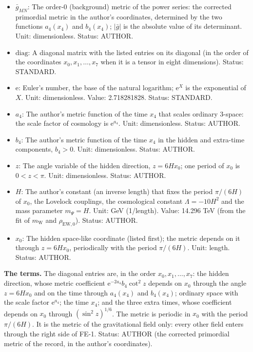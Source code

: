 \documentclass[
  10pt,
]{article}
\providecommand{\tightlist}{%
  \setlength{\itemsep}{0pt}\setlength{\parskip}{0pt}}
\begin{document}
\begin{itemize}
\tightlist
\item
  \(\bar g_{MN}\): The order-0 (background) metric of the power series:
  the corrected primordial metric in the author's coordinates,
  determined by the two functions \(a_4(x_4)\) and \(b_4(x_4)\);
  \(\lvert\bar g\rvert\) is the absolute value of its determinant. Unit:
  dimensionless. Status: AUTHOR.
\item
  \(\mathrm{diag}\): A diagonal matrix with the listed entries on its
  diagonal (in the order of the coordinates \(x_0, x_1, \dots, x_7\)
  when it is a tensor in eight dimensions). Status: STANDARD.
\item
  \(\mathrm{e}\): Euler's number, the base of the natural logarithm;
  \(\mathrm{e}^{X}\) is the exponential of \(X\). Unit: dimensionless.
  Value: 2.718281828. Status: STANDARD.
\item
  \(a_4\): The author's metric function of the time \(x_4\) that scales
  ordinary 3-space: the scale factor of cosmology is
  \(\mathrm{e}^{a_4}\). Unit: dimensionless. Status: AUTHOR.
\item
  \(b_4\): The author's metric function of the time \(x_4\) in the
  hidden and extra-time components, \(b_4 > 0\). Unit: dimensionless.
  Status: AUTHOR.
\item
  \(z\): The angle variable of the hidden direction, \(z = 6Hx_0\); one
  period of \(x_0\) is \(0 < z < \pi\). Unit: dimensionless. Status:
  AUTHOR.
\item
  \(H\): The author's constant (an inverse length) that fixes the period
  \(\pi/(6H)\) of \(x_0\), the Lovelock couplings, the cosmological
  constant \(\Lambda = -10H^2\) and the mass parameter \(m_\Psi = H\).
  Unit: GeV (1/length). Value: 14.296 TeV (from the fit of
  \(m_{\mathrm{W}}\) and \(\rho_{\mathrm{EW},0}\)). Status: AUTHOR.
\item
  \(x_0\): The hidden space-like coordinate (listed first); the metric
  depends on it through \(z = 6Hx_0\), periodically with the period
  \(\pi/(6H)\). Unit: length. Status: AUTHOR.
\end{itemize}

\textbf{The terms.} The diagonal entries are, in the order
\(x_0, x_1, \dots, x_7\): the hidden direction, whose metric coefficient
\(\mathrm{e}^{-2a_4}b_4\cot^2z\) depends on \(x_0\) through the angle
\(z = 6Hx_0\) and on the time through \(a_4(x_4)\) and \(b_4(x_4)\);
ordinary space with the scale factor \(\mathrm{e}^{a_4}\); the time
\(x_4\); and the three extra times, whose coefficient depends on \(x_0\)
through \((\sin^2z)^{1/6}\). The metric is periodic in \(x_0\) with the
period \(\pi/(6H)\). It is the metric of the gravitational field only:
every other field enters through the right side of FE-1. Status: AUTHOR
(the corrected primordial metric of the record, in the author's
coordinates).
\end{document}
